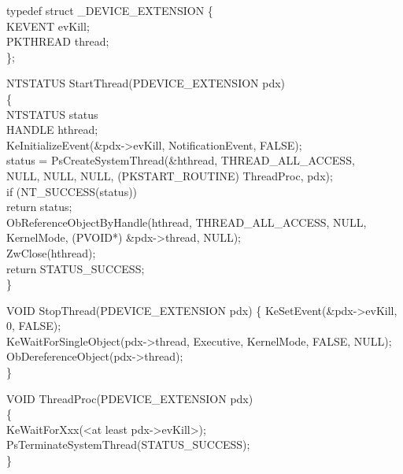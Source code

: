 \documentclass[letterpaper,10pt,draftclsnofoot,onecolumn]{IEEEtran}
\begin{document}
\noindent typedef struct \_DEVICE\_EXTENSION \{\\
  \quad KEVENT evKill;\\
  \quad PKTHREAD thread;\\
\};

\noindent NTSTATUS StartThread(PDEVICE\_EXTENSION pdx)\\
\{\\
  \quad NTSTATUS status\\
  \quad HANDLE hthread;\\
  \quad KeInitializeEvent(\&pdx->evKill, NotificationEvent, FALSE);\\
  \quad status = PsCreateSystemThread(\&hthread, THREAD\_ALL\_ACCESS,\\
    \qquad NULL, NULL, NULL, (PKSTART\_ROUTINE) ThreadProc, pdx);\\
  \quad if (\!NT\_SUCCESS(status))\\
    \qquad return status;\\
  \quad ObReferenceObjectByHandle(hthread, THREAD\_ALL\_ACCESS, NULL,\\
    \qquad KernelMode, (PVOID*) \&pdx->thread, NULL);\\
  \quad ZwClose(hthread);\\
  \quad return STATUS\_SUCCESS;\\
\}

\noindent VOID StopThread(PDEVICE\_EXTENSION pdx)
\{
  \quad KeSetEvent(\&pdx->evKill, 0, FALSE);\\
  \quad KeWaitForSingleObject(pdx->thread, Executive, KernelMode, FALSE, NULL);\\
  \quad ObDereferenceObject(pdx->thread);\\
\}

\noindent VOID ThreadProc(PDEVICE\_EXTENSION pdx)\\
\{\\
  \quad KeWaitForXxx(<at least pdx->evKill>);\\
  \quad PsTerminateSystemThread(STATUS\_SUCCESS);\\
\}\\
\end{document}
